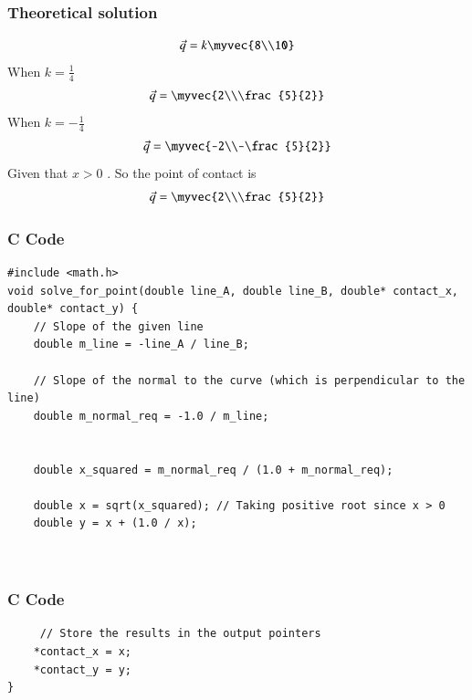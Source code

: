 \documentclass{beamer}
\begin{document}
     \begin{frame}
    \frametitle{Theoretical solution}
\begin{align}
    \Vec{q}=k\myvec{8\\10}
\end{align}
When $k=\frac{1}{4}$
\begin{align}
    \Vec{q}=\myvec{2\\\frac{5}{2}}
\end{align}
When $k=-\frac{1}{4}$
\begin{align}
    \Vec{q}=\myvec{-2\\-\frac{5}{2}}
\end{align}
Given that $x>0$ . So the point of contact is 
\begin{align}
     \Vec{q}=\myvec{2\\\frac{5}{2}}
\end{align}


    \end{frame}
    
    
   
    \begin{frame}[fragile]
        \frametitle{C Code}
        \begin{lstlisting}
#include <math.h>
void solve_for_point(double line_A, double line_B, double* contact_x, double* contact_y) {
    // Slope of the given line
    double m_line = -line_A / line_B;

    // Slope of the normal to the curve (which is perpendicular to the line)
    double m_normal_req = -1.0 / m_line;
    
    
    double x_squared = m_normal_req / (1.0 + m_normal_req);
    
    double x = sqrt(x_squared); // Taking positive root since x > 0
    double y = x + (1.0 / x);
    
  
        \end{lstlisting}
    \end{frame}
    
    \begin{frame}[fragile]
        \frametitle{C Code}
        \begin{lstlisting}
     // Store the results in the output pointers
    *contact_x = x;
    *contact_y = y;
}
        \end{lstlisting}
    \end{frame}
    
   
    
\end{document}

